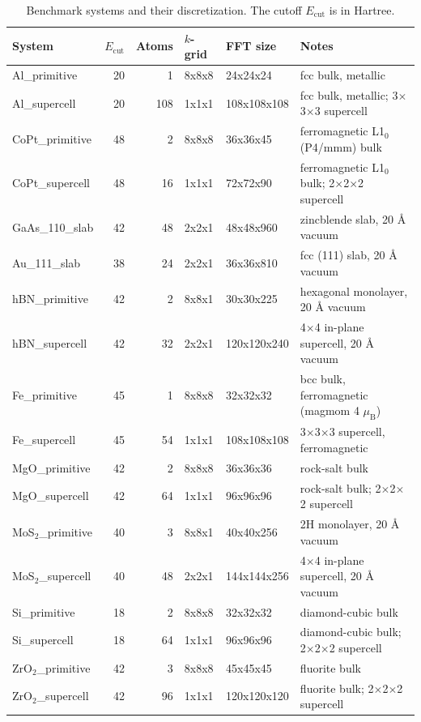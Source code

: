 \providecommand{\toprule}{\hline}
\providecommand{\midrule}{\hline}
\providecommand{\bottomrule}{\hline}
\begin{table}[htbp]
\centering
\setlength{\tabcolsep}{8pt}
\caption{Benchmark systems and their discretization. The cutoff $E_{\mathrm{cut}}$ is in Hartree.}
\label{tab:systems}
\begin{tabular}{lrrlll}
\toprule
System & $E_{\mathrm{cut}}$ & Atoms & $k$-grid & FFT size & Notes \\
\midrule
Al\_primitive & 20 & 1 & 8x8x8 & 24x24x24 & fcc bulk, metallic \\
Al\_supercell & 20 & 108 & 1x1x1 & 108x108x108 & fcc bulk, metallic; 3$\times$3$\times$3 supercell \\
CoPt\_primitive & 48 & 2 & 8x8x8 & 36x36x45 & ferromagnetic L1$_0$ (P4/mmm) bulk \\
CoPt\_supercell & 48 & 16 & 1x1x1 & 72x72x90 & ferromagnetic L1$_0$ bulk; 2$\times$2$\times$2 supercell \\
GaAs\_110\_slab & 42 & 48 & 2x2x1 & 48x48x960 & zincblende slab, 20 \AA{} vacuum \\
Au\_111\_slab & 38 & 24 & 2x2x1 & 36x36x810 & fcc (111) slab, 20 \AA{} vacuum \\
hBN\_primitive & 42 & 2 & 8x8x1 & 30x30x225 & hexagonal monolayer, 20 \AA{} vacuum \\
hBN\_supercell & 42 & 32 & 2x2x1 & 120x120x240 & 4$\times$4 in-plane supercell, 20 \AA{} vacuum \\
Fe\_primitive & 45 & 1 & 8x8x8 & 32x32x32 & bcc bulk, ferromagnetic (magmom 4 $\mu_{\mathrm{B}}$) \\
Fe\_supercell & 45 & 54 & 1x1x1 & 108x108x108 & 3$\times$3$\times$3 supercell, ferromagnetic \\
MgO\_primitive & 42 & 2 & 8x8x8 & 36x36x36 & rock-salt bulk \\
MgO\_supercell & 42 & 64 & 1x1x1 & 96x96x96 & rock-salt bulk; 2$\times$2$\times$2 supercell \\
MoS$_2$\_primitive & 40 & 3 & 8x8x1 & 40x40x256 & 2H monolayer, 20 \AA{} vacuum \\
MoS$_2$\_supercell & 40 & 48 & 2x2x1 & 144x144x256 & 4$\times$4 in-plane supercell, 20 \AA{} vacuum \\
Si\_primitive & 18 & 2 & 8x8x8 & 32x32x32 & diamond-cubic bulk \\
Si\_supercell & 18 & 64 & 1x1x1 & 96x96x96 & diamond-cubic bulk; 2$\times$2$\times$2 supercell \\
ZrO$_2$\_primitive & 42 & 3 & 8x8x8 & 45x45x45 & fluorite bulk \\
ZrO$_2$\_supercell & 42 & 96 & 1x1x1 & 120x120x120 & fluorite bulk; 2$\times$2$\times$2 supercell \\
\bottomrule
\end{tabular}
\end{table}
